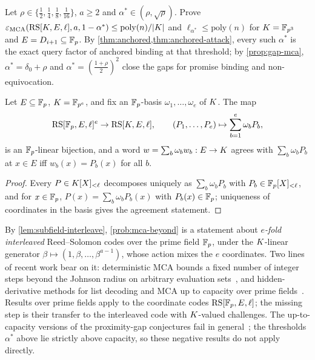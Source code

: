 \begin{problem}\label{prob:mca-beyond}
Let $\rho\in\{\frac12,\frac14,\frac18,\frac1{16}\}$, $a\ge2$ and $\alpha^\ast\in(\rho,\sqrt\rho)$.
Prove $\varepsilon_{\mathrm{MCA}}(\mathrm{RS}[K,E,\ell],a,1-\alpha^\ast)\le\mathrm{poly}(n)/|K|$ and
$\ell_{\alpha^\ast}\le\mathrm{poly}(n)$ for $K=\mathbb{F}_{p^3}$ and $E=D_{i+1}\subseteq\mathbb{F}_p$.
By \cref{thm:anchored,thm:anchored-attack}, every such $\alpha^\ast$ is the exact query
factor of anchored binding at that threshold; by \cref{prop:gap-mca},
$\alpha^\ast=\delta_0+\rho$ and $\alpha^\ast=(\frac{1+\rho}2)^2$ close the gaps for promise
binding and non-equivocation.
\end{problem}

\begin{lemma}\label{lem:subfield-interleave}
Let $E\subseteq\mathbb{F}_p$, $K=\mathbb{F}_{p^e}$, and fix an $\mathbb{F}_p$-basis $\omega_1,\dots,\omega_e$ of
$K$. The map
\[
\mathrm{RS}[\mathbb{F}_p,E,\ell]^{e}\to\mathrm{RS}[K,E,\ell],\qquad (P_1,\dots,P_e)\mapsto\sum_{b=1}^{e}\omega_bP_b,
\]
is an $\mathbb{F}_p$-linear bijection, and a word $w=\sum_b\omega_bw_b:E\to K$ agrees with
$\sum_b\omega_bP_b$ at $x\in E$ iff $w_b(x)=P_b(x)$ for all $b$.
\end{lemma}

\begin{proof}
Every $P\in K[X]_{<\ell}$ decomposes uniquely as $\sum_b\omega_bP_b$ with
$P_b\in\mathbb{F}_p[X]_{<\ell}$, and for $x\in\mathbb{F}_p$, $P(x)=\sum_b\omega_bP_b(x)$ with
$P_b(x)\in\mathbb{F}_p$; uniqueness of coordinates in the basis gives the agreement statement.
\end{proof}

By \cref{lem:subfield-interleave}, \cref{prob:mca-beyond} is a statement about
\emph{$e$-fold interleaved} Reed--Solomon codes over the prime field $\mathbb{F}_p$, under the
$K$-linear generator $\beta\mapsto(1,\beta,\dots,\beta^{a-1})$, whose action mixes the
$e$ coordinates. Two lines of recent work bear on it: deterministic MCA bounds a fixed
number of integer steps beyond the Johnson radius on arbitrary evaluation
sets~\cite{Jo26}, and hidden-derivative methods for list decoding and MCA up to capacity
over prime fields~\cite{DKT26,Jer26}. Results over prime fields apply to the coordinate
codes $\mathrm{RS}[\mathbb{F}_p,E,\ell]$; the missing step is their transfer to the interleaved code with
$K$-valued challenges. The up-to-capacity versions of the proximity-gap conjectures fail
in general~\cite{BCHKS25}; the thresholds $\alpha^\ast$ above lie strictly above
capacity, so these negative results do not apply directly.

